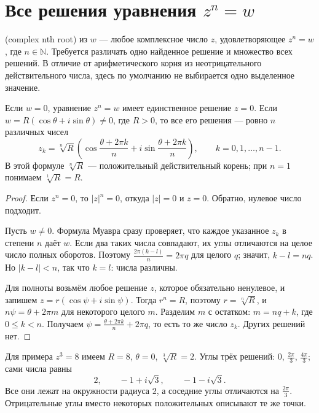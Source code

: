 \section{Все решения уравнения \(z^n=w\)}
\begin{definition}
 (complex nth root) из \(w\) — любое комплексное число \(z\), удовлетворяющее \(z^n=w\), где \(n\in\mathbb N\). Требуется различать одно найденное решение и множество всех решений. В отличие от арифметического корня из неотрицательного действительного числа, здесь по умолчанию не выбирается одно выделенное значение.
\end{definition}
\begin{theorem}\label{thm:legacy-c23-7}
Если \(w=0\), уравнение \(z^n=w\) имеет единственное решение \(z=0\). Если \(w=R(\cos\theta+i\sin\theta)\ne0\), где \(R>0\), то все его решения — ровно \(n\) различных чисел
\[
z_k=\sqrt[n]{R}\left(\cos\frac{\theta+2\pi k}{n}
+i\sin\frac{\theta+2\pi k}{n}\right),
\qquad k=0,1,\ldots,n-1.
\]
В этой формуле \(\sqrt[n]{R}\) — положительный действительный корень; при \(n=1\) понимаем \(\sqrt[1]{R}=R\).
\end{theorem}
\begin{proof}
Если \(z^n=0\), то \(|z|^n=0\), откуда \(|z|=0\) и \(z=0\). Обратно, нулевое число подходит.

Пусть \(w\ne0\). Формула Муавра сразу проверяет, что каждое указанное \(z_k\) в степени \(n\) даёт \(w\). Если два таких числа совпадают, их углы отличаются на целое число полных оборотов. Поэтому \(\frac{2\pi(k-l)}n=2\pi q\) для целого \(q\); значит, \(k-l=nq\). Но \(|k-l|<n\), так что \(k=l\): числа различны.

Для полноты возьмём любое решение \(z\), которое обязательно ненулевое, и запишем \(z=r(\cos\psi+i\sin\psi)\). Тогда \(r^n=R\), поэтому \(r=\sqrt[n]R\), и \(n\psi=\theta+2\pi m\) для некоторого целого \(m\). Разделим \(m\) с остатком: \(m=nq+k\), где \(0\le k<n\). Получаем \(\psi=\frac{\theta+2\pi k}n+2\pi q\), то есть то же число \(z_k\). Других решений нет.
\end{proof}
Для примера \(z^3=8\) имеем \(R=8\), \(\theta=0\), \(\sqrt[3]R=2\). Углы трёх решений: \(0\), \(\frac{2\pi}{3}\), \(\frac{4\pi}{3}\); сами числа равны
\[
2,\qquad -1+i\sqrt3,\qquad -1-i\sqrt3.
\]
Все они лежат на окружности радиуса \(2\), а соседние углы отличаются на \(\frac{2\pi}3\). Отрицательные углы вместо некоторых положительных описывают те же точки.

